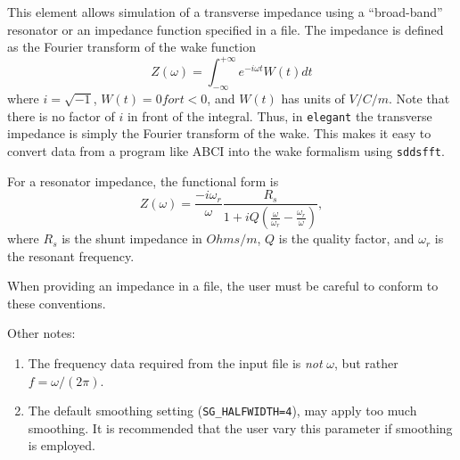 This element allows simulation of a transverse impedance using a
``broad-band'' resonator or an impedance function specified in a file.
The impedance is defined as the Fourier transform of the wake function
\begin{equation}
Z(\omega) = \int_{-\infty}^{+\infty} e^{-i \omega t} W(t) dt
\end{equation}
where $i = \sqrt{-1}$, $W(t)=0 for t<0$, and $W(t)$ has units of
$V/C/m$.  Note that there is no factor of $i$ in front of the
integral.  Thus, in {\tt elegant} the transverse impedance is simply
the Fourier transform of the wake.  This makes it easy to convert data
from a program like ABCI into the wake formalism using {\tt sddsfft}.

For a resonator impedance, the functional form is
\begin{equation}
Z(\omega) = \frac{-i\omega_r}{\omega} \frac{R_s}{1 + iQ(\frac{\omega}{\omega_r} - \frac{\omega_r}{\omega})},
\end{equation}
where $R_s$ is the shunt impedance in $Ohms/m$, $Q$ is the quality
factor, and $\omega_r$ is the resonant frequency.

When providing an impedance in a file, the user must be careful to conform to these
conventions.

Other notes:
\begin{enumerate}
\item The frequency data required from the input file is {\em not} $\omega$, but rather
  $f = \omega/(2 \pi)$.
\item The default smoothing setting ({\tt SG\_HALFWIDTH=4}), may apply too much smoothing.
It is recommended that the user vary this parameter if smoothing is employed.
\end{enumerate}

